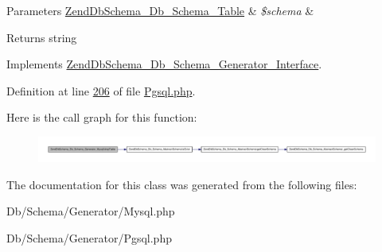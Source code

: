 \begin{DoxyParams}[1]{\-Parameters}
\hyperlink{classZendDbSchema__Db__Schema__Table}{\-Zend\-Db\-Schema\-\_\-\-Db\-\_\-\-Schema\-\_\-\-Table} & {\em \$schema} & \\
\hline
\end{DoxyParams}
\begin{DoxyReturn}{\-Returns}
string 
\end{DoxyReturn}


\-Implements \hyperlink{interfaceZendDbSchema__Db__Schema__Generator__Interface_a12376af2b8f922a367dd045abbef67a5}{\-Zend\-Db\-Schema\-\_\-\-Db\-\_\-\-Schema\-\_\-\-Generator\-\_\-\-Interface}.



\-Definition at line \hyperlink{Schema_2Generator_2Pgsql_8php_source_l00206}{206} of file \hyperlink{Schema_2Generator_2Pgsql_8php_source}{\-Pgsql.\-php}.



\-Here is the call graph for this function\-:\nopagebreak
\begin{figure}[H]
\begin{center}
\leavevmode
\includegraphics[width=350pt]{classZendDbSchema__Db__Schema__Generator__Mysql_a963a138b593e5e9e3a6b9a8e540a4a10_cgraph}
\end{center}
\end{figure}




\-The documentation for this class was generated from the following files\-:\begin{DoxyCompactItemize}
\item 
\-Db/\-Schema/\-Generator/\-Mysql.\-php\item 
\-Db/\-Schema/\-Generator/\-Pgsql.\-php\end{DoxyCompactItemize}
